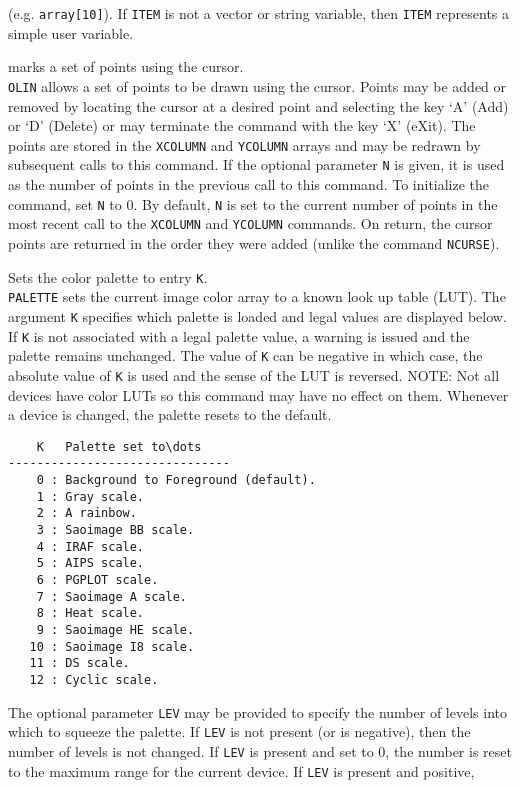 	(e.g.  {\tt array[10]}).  If {\tt ITEM} is not a
	vector or string variable, then {\tt ITEM} represents a
	simple user variable.
\item [{\tt OLIN [n] } --] marks a set of points using the cursor.\\
	{\tt OLIN} allows a set of points to be drawn using the
	cursor.  Points may be added or removed by locating the cursor
	at a desired point and selecting the key `A' (Add) or `D' (Delete)
	or may terminate the command with the key `X' (eXit).  The points
	are stored in the {\tt XCOLUMN} and
	{\tt YCOLUMN} arrays and may be
	redrawn by subsequent calls to this command.  If the optional
	parameter {\tt N} is given, it is used as the number of
	points in the previous call to this command.  To initialize the
	command, set {\tt N} to 0.  By default, {\tt N}
	is set to the current number of points in the most recent call
	to the {\tt XCOLUMN}
	and {\tt YCOLUMN} commands.  On
	return, the cursor points are returned in the order they were
	added (unlike the command {\tt NCURSE}).
\item [{\tt PALETTE K [LEV] } --] Sets the color palette to entry {\tt K}.\\
	{\tt PALETTE} sets the current image color array to a
	known look up table (LUT).  The argument {\tt K} specifies
	which palette is loaded and legal values are displayed below.
	If {\tt K} is not associated with a legal palette value,
	a warning is issued and the palette remains unchanged.  The
	value of {\tt K} can be negative in which case, the
	absolute value of {\tt K} is used and the sense of the LUT
	is reversed.
	NOTE: Not all devices have color LUTs so this
	command may have no effect on them.  Whenever a device is
	changed, the palette resets to the default.
	\begin{verbatim}
    K   Palette set to\dots
-------------------------------
    0 : Background to Foreground (default).
    1 : Gray scale.
    2 : A rainbow.
    3 : Saoimage BB scale.
    4 : IRAF scale.
    5 : AIPS scale.
    6 : PGPLOT scale.
    7 : Saoimage A scale.
    8 : Heat scale.
    9 : Saoimage HE scale.
   10 : Saoimage I8 scale.
   11 : DS scale.
   12 : Cyclic scale.
	\end{verbatim}
	The optional parameter {\tt LEV} may be provided to
	specify the number of levels into which to squeeze the palette.
	If {\tt LEV} is not present (or is negative), then the
	number of levels is not changed.  If {\tt LEV} is present
	and set to 0, the number is reset to the maximum range for the
	current device.  If {\tt LEV} is present and positive,
